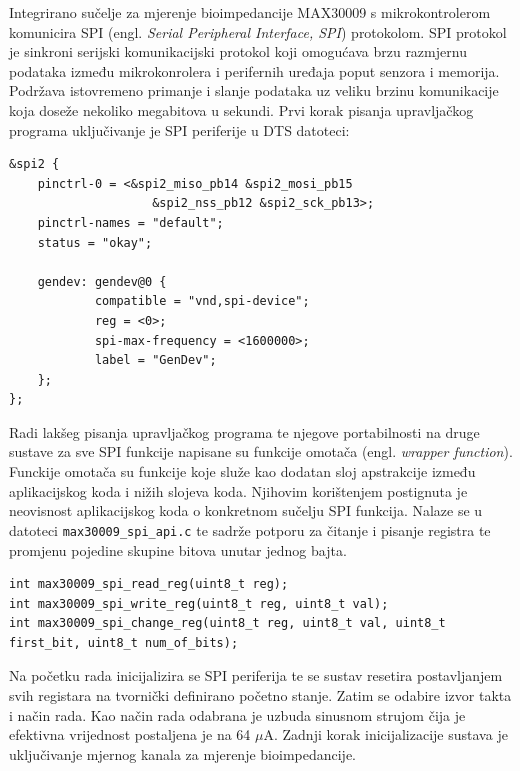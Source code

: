 \documentclass[../diplomski_rad.tex]{subfiles}
\begin{document}
Integrirano sučelje za mjerenje bioimpedancije MAX30009 s mikrokontrolerom komunicira SPI 
(engl. \textit{Serial Peripheral Interface, SPI}) protokolom. 
SPI protokol je sinkroni serijski komunikacijski protokol koji omogućava brzu razmjernu podataka između 
mikrokonrolera i perifernih uređaja poput senzora i memorija. 
Podržava istovremeno primanje i slanje podataka uz veliku 
brzinu komunikacije koja doseže nekoliko megabitova u sekundi.
Prvi korak pisanja upravljačkog programa uključivanje je SPI periferije u DTS datoteci:  
\begin{lstlisting}[label={lst:dts_max30009},style=CStyle,caption={Definiranje MAX30009 senzora u DTS-u},captionpos=b]
&spi2 {
    pinctrl-0 = <&spi2_miso_pb14 &spi2_mosi_pb15 
                    &spi2_nss_pb12 &spi2_sck_pb13>;
    pinctrl-names = "default";
    status = "okay";

    gendev: gendev@0 {
            compatible = "vnd,spi-device";
            reg = <0>;
            spi-max-frequency = <1600000>;
            label = "GenDev";
    };	
};
\end{lstlisting} 

Radi lakšeg pisanja upravljačkog programa te njegove portabilnosti na druge sustave za sve SPI funkcije 
napisane su funkcije omotača (engl. \textit{wrapper function}). 
Funckije omotača su funkcije koje služe kao dodatan sloj apstrakcije između aplikacijskog koda i nižih slojeva koda. 
Njihovim korištenjem postignuta je neovisnost aplikacijskog koda o konkretnom sučelju 
SPI funkcija. 
Nalaze se u datoteci \texttt{max30009\_spi\_api.c} te sadrže 
potporu za čitanje i pisanje registra te promjenu pojedine skupine bitova unutar jednog bajta. 

\begin{lstlisting}[label={lst:api_api},style=CStyle,caption={Funkcije omotača SPI komunikacije},captionpos=b]
int max30009_spi_read_reg(uint8_t reg);
int max30009_spi_write_reg(uint8_t reg, uint8_t val);
int max30009_spi_change_reg(uint8_t reg, uint8_t val, uint8_t first_bit, uint8_t num_of_bits);
\end{lstlisting} 

Na početku rada inicijalizira se SPI periferija te se sustav resetira postavljanjem svih registara na tvornički definirano početno stanje. 
Zatim se odabire izvor takta i način rada. Kao način rada odabrana je uzbuda sinusnom strujom 
čija je efektivna vrijednost postaljena je na 64  $\mu$A. 
Zadnji korak inicijalizacije sustava je uključivanje mjernog kanala za mjerenje bioimpedancije.
\end{document}
